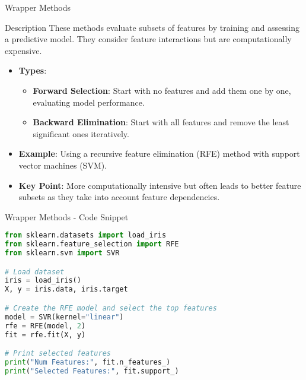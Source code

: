 \documentclass[aspectratio=169]{beamer}
\begin{document}
\begin{frame}[fragile]{Wrapper Methods}
    \begin{block}{Description}
        These methods evaluate subsets of features by training and assessing a predictive model. 
        They consider feature interactions but are computationally expensive.
    \end{block}
    
    \begin{itemize}
        \item \textbf{Types}:
            \begin{itemize}
                \item \textbf{Forward Selection}: Start with no features and add them one by one, evaluating model performance.
                \item \textbf{Backward Elimination}: Start with all features and remove the least significant ones iteratively.
            \end{itemize}
        \item \textbf{Example}: Using a recursive feature elimination (RFE) method with support vector machines (SVM).
        \item \textbf{Key Point}: More computationally intensive but often leads to better feature subsets as they take into account feature dependencies.
    \end{itemize}
\end{frame}

\begin{frame}[fragile]{Wrapper Methods - Code Snippet}
    \begin{lstlisting}[language=Python]
from sklearn.datasets import load_iris
from sklearn.feature_selection import RFE
from sklearn.svm import SVR

# Load dataset
iris = load_iris()
X, y = iris.data, iris.target

# Create the RFE model and select the top features
model = SVR(kernel="linear")
rfe = RFE(model, 2)
fit = rfe.fit(X, y)

# Print selected features
print("Num Features:", fit.n_features_)
print("Selected Features:", fit.support_)
    \end{lstlisting}
\end{frame}
\end{document}
